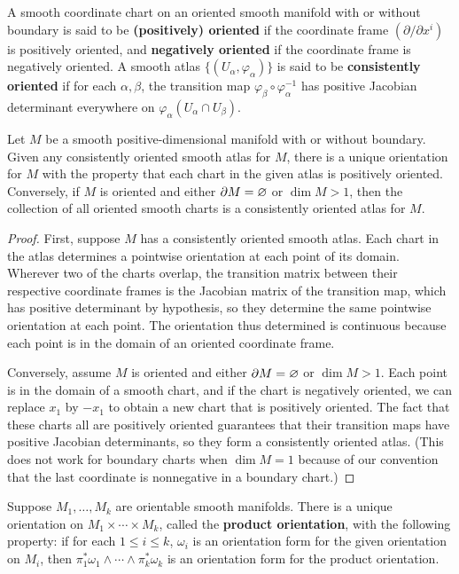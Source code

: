 A smooth coordinate chart on an oriented smooth manifold with or without boundary is said to be \textbf{(positively) oriented} if the coordinate frame $(\partial/\partial x^i)$ is positively oriented, and \textbf{negatively oriented} if the coordinate frame is negatively oriented. A smooth atlas $\{(U_\alpha,\varphi_\alpha)\}$ is said to be \textbf{consistently oriented} if for each $\alpha,\beta$, the transition map $\varphi_\beta\circ\varphi_\alpha^{-1}$ has positive Jacobian determinant everywhere on $\varphi_\alpha(U_\alpha\cap U_\beta)$.
\begin{proposition}\label{orientation by atlas}
Let $M$ be a smooth positive-dimensional manifold with or without boundary. Given any consistently oriented smooth atlas for $M$, there is a unique orientation for $M$ with the property that each chart in the given atlas is positively oriented. Conversely, if $M$ is oriented and either $\partial M=\varnothing$ or $\dim M>1$, then the collection of all oriented smooth charts is a consistently oriented atlas for $M$.
\end{proposition}
\begin{proof}
First, suppose $M$ has a consistently oriented smooth atlas. Each chart in the atlas determines a pointwise orientation at each point of its domain. Wherever two of the charts overlap, the transition matrix between their respective coordinate frames is the Jacobian matrix of the transition map, which has positive determinant by hypothesis, so they determine the same pointwise orientation at each point. The orientation thus determined is continuous because each point is in the domain of an
oriented coordinate frame.\par
Conversely, assume $M$ is oriented and either $\partial M=\varnothing$ or $\dim M>1$. Each point is in the domain of a smooth chart, and if the chart is negatively oriented, we can replace $x_1$ by $-x_1$ to obtain a new chart that is positively oriented. The fact that these charts all are positively oriented guarantees that their transition maps have positive Jacobian determinants, so they form a consistently oriented atlas. (This does not work for boundary charts when $\dim M=1$ because of our convention that the last coordinate is nonnegative in a boundary chart.)
\end{proof}
\begin{proposition}
Suppose $M_1,\dots,M_k$ are orientable smooth manifolds. There is a unique orientation on $M_1\times\cdots\times M_k$, called the \textbf{product orientation}, with the following property: if for each $1\leq i\leq k$, $\omega_i$ is an orientation form for the given orientation on $M_i$, then $\pi_1^*\omega_1\wedge\cdots\wedge\pi_k^*\omega_k$ is an orientation form for the product orientation.
\end{proposition}
